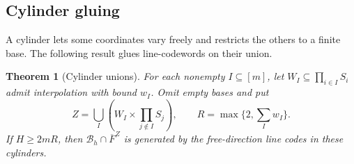 \documentclass[11pt,letterpaper]{article}
\renewcommand{\ge}{\geqslant}
\newtheorem{theorem}{Theorem}[section]
\theoremstyle{definition}
\theoremstyle{remark}
\newcommand{\cB}{\mathcal B}
\begin{document}
\subsection{Cylinder gluing}
\label{sec:cylinders}\label{sec:B3}

A cylinder lets some coordinates vary freely and restricts the others
to a finite base. The following result glues line-codewords on their union.

\begin{theorem}[Cylinder unions]
\label{arb:cylinders}\label{thm:cylinders}
For each nonempty $I\subseteq[m]$, let
$W_I\subseteq\prod_{i\in I}S_i$ admit interpolation with bound $w_I$.
Omit empty bases and put
\[
 Z=\bigcup_I\left(W_I\times\prod_{j\notin I}S_j\right),
 \qquad R=\max\{2,\sum_Iw_I\}.
\]
If $H\ge2mR$, then $\cB_h\cap\overline F^Z$ is generated by the
free-direction line codes in these cylinders.
\end{theorem}
\end{document}

